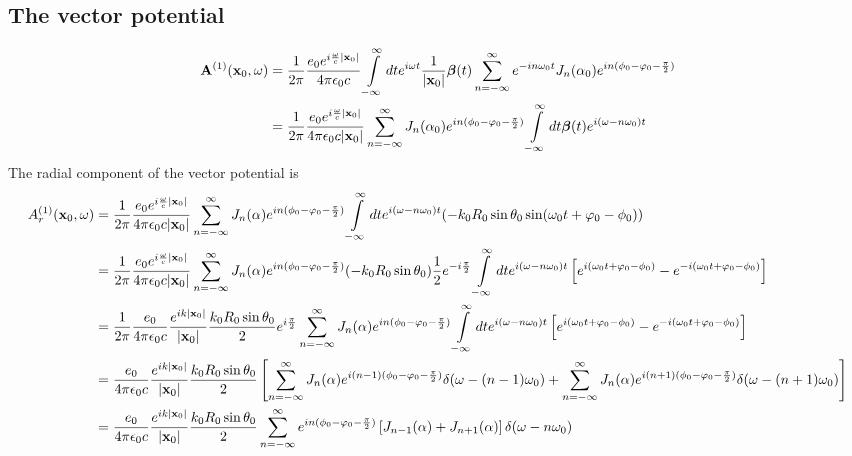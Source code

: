 \subsection{The vector potential}
\begin{align}
    {\bf A}^{(1)}({\bf x}_0,\omega) & =\frac1{2\pi}\frac{e_0 e^{i\frac{\omega}c|{\bf x}_0|}}{4\pi\epsilon_0 c}\int\limits_{-\infty}^{\infty}dte^{i\omega t} \frac1{|{\bf x}_0|}{\boldsymbol{\beta}}(t)\sum\limits_{n=-\infty}^{\infty} e^{-i n \omega_0 t}J_n(\alpha_0) e^{in(\phi_0-\varphi_0-\frac{\pi}2)}\nonumber \\
                                    & =\frac1{2\pi}\frac{e_0 e^{i\frac{\omega}c|{\bf x}_0|}}{4\pi\epsilon_0c|{\bf x}_0|}\sum\limits_{n=-\infty}^{\infty}J_n(\alpha_0) e^{in(\phi_0-\varphi_0-\frac{\pi}2)}\int\limits_{-\infty}^{\infty}dt {\boldsymbol{\beta}}(t)e^{i(\omega-n\omega_0)t}
\end{align}
The radial component of the vector potential is
\begin{align}
    {A}_r^{(1)}({\bf x}_0,\omega) & =\frac1{2\pi}\frac{e_0 e^{i\frac{\omega}c|{\bf x}_0|}}{4\pi\epsilon_0c|{\bf x}_0|}\sum\limits_{n=-\infty}^{\infty}J_n(\alpha) e^{in(\phi_0-\varphi_0-\frac{\pi}2)}\int\limits_{-\infty}^{\infty}dt e^{i(\omega-n\omega_0)t}(-k_0 R_0\sin\theta_0 \sin(\omega_0 t+\varphi_0-\phi_0))\nonumber                                                                           \\
                                  & =\frac1{2\pi}\frac{e_0 e^{i\frac{\omega}c|{\bf x}_0|}}{4\pi\epsilon_0c|{\bf x}_0|}\sum\limits_{n=-\infty}^{\infty}J_n(\alpha) e^{in(\phi_0-\varphi_0-\frac{\pi}2)}(-k_0R_0\sin\theta_0)\frac1{2}e^{-i\frac{\pi}2}\int\limits_{-\infty}^{\infty}dt e^{i(\omega-n\omega_0)t}\left[e^{i(\omega_0 t+\varphi_0-\phi_0)}-e^{-i(\omega_0 t+\varphi_0-\phi_0)}\right]\nonumber \\
                                  & =\frac1{2\pi}\frac{e_0}{4\pi\epsilon_0c}\frac{e^{ik|{\bf x}_0|}}{|{\bf x}_0|}\frac{k_0R_0\sin\theta_0}{2}e^{i\frac{\pi}2}\sum\limits_{n=-\infty}^{\infty}J_n(\alpha) e^{in(\phi_0-\varphi_0-\frac{\pi}2)}\int\limits_{-\infty}^{\infty}dt e^{i(\omega-n\omega_0)t}\left[e^{i(\omega_0 t+\varphi_0-\phi_0)}-e^{-i(\omega_0 t+\varphi_0-\phi_0)}\right]\nonumber         \\
                                  & =\frac{e_0}{4\pi\epsilon_0c}\frac{e^{ik|{\bf x}_0|}}{|{\bf x}_0|}\frac{k_0R_0\sin\theta_0}{2}\left[\sum\limits_{n=-\infty}^{\infty}J_n(\alpha) e^{i(n-1)(\phi_0-\varphi_0-\frac{\pi}2)}\delta(\omega-(n-1)\omega_0)+\sum\limits_{n=-\infty}^{\infty}J_n(\alpha) e^{i(n+1)(\phi_0-\varphi_0-\frac{\pi}2)}\delta(\omega-(n+1)\omega_0)\right]\nonumber                   \\
                                  & =\frac{e_0}{4\pi\epsilon_0c}\frac{e^{ik|{\bf x}_0|}}{|{\bf x}_0|}\frac{k_0R_0\sin\theta_0}{2}\sum\limits_{n=-\infty}^{\infty}e^{in(\phi_0-\varphi_0-\frac{\pi}2)}\left[J_{n-1}(\alpha)+J_{n+1}(\alpha)\right]\delta(\omega-n\omega_0)
\end{align}

